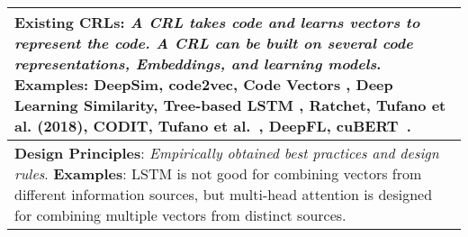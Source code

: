 \begin{table}[h]
\begin{center}
{\begin{tabular}{p{16.5cm}<{\centering\raggedright}}
			
			\textbf{Existing CRLs}: \textit{A CRL takes code and learns vectors to represent the code. A CRL can be built on several code representations, Embeddings, and learning models}. \textbf{Examples}: DeepSim\cite{Zhao-2018}, code2vec\cite{Alon-2018}, Code Vectors \cite{Henkel-2018}, Deep Learning Similarity\cite{Tufano-2018}, Tree-based LSTM \cite{Tai-2015}, Ratchet\cite{Rachet}, Tufano et al. (2018)\cite{tufano2018empirical}, CODIT\cite{CODIT}, Tufano et al.~\cite{Tufano}, DeepFL\cite{DeepFL}, cuBERT~\cite{kanade2020learning}.\\
			\hline
			
		    \textbf{Design Principles}: \textit{Empirically obtained best practices and design rules}. \textbf{Examples}: LSTM is not good for combining vectors from different information sources, but multi-head attention is designed for combining multiple vectors from distinct sources.\\
			\hline
			
			\end{tabular}
		}
		
	\end{center}
	\vspace{-15pt}
\end{table}
